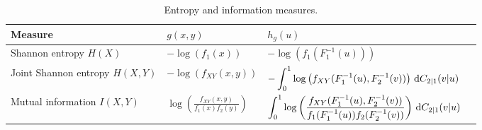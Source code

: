 \documentclass[12pt]{article}
\begin{document}
\begin{table}[H]
\centering
\caption{Entropy and information measures.}
\renewcommand{\arraystretch}{1.2}
\begin{tabular}{llll}
\hline
Measure & $g(x,y)$ & $h_g(u)$ \\
\hline

Shannon entropy 
$H(X)$
&
$-\log({f}_1(x))$ 
&
$\displaystyle
-\log\left({f}_1(F_1^{-1}(u))\right)
$
\\[2mm]

Joint Shannon entropy 
$H(X,Y)$
&
$-\log\left(f_{XY}(x,y)\right)$
&
$\displaystyle
-\int_0^1
\log\left(
f_{XY}
(F_1^{-1}(u),F_2^{-1}(v))\right)
\,{\rm d}C_{2|1}(v|u)
$
\\[2mm]

Mutual information 
$I(X,Y)$
&
$\displaystyle
\log\left(
\frac{
f_{XY}(x,y)
}{
f_1(x)f_2(y)
}
\right)
$
&
$\displaystyle
\int_0^1
\log
\left(
\frac{
f_{XY}(F_1^{-1}(u),F_2^{-1}(v))
}{
f_1(F_1^{-1}(u))
f_2(F_2^{-1}(v))
}
\right)
\,{\rm d}C_{2|1}(v|u)
$
\\[4mm]

\hline
\end{tabular}
\label{Table-4}
\end{table}

\end{document}
